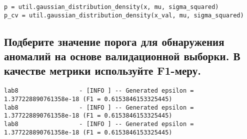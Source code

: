 \begin{lstlisting}
p = util.gaussian_distribution_density(x, mu, sigma_squared)
p_cv = util.gaussian_distribution_density(x_val, mu, sigma_squared)
\end{lstlisting}

\subsection{Подберите значение порога для обнаружения аномалий на основе валидационной выборки. В качестве метрики используйте F1-меру.}

\begin{lstlisting}
lab8                 - [INFO ] -- Generated epsilon = 1.377228890761358e-18 (F1 = 0.6153846153325445)
lab8                 - [INFO ] -- Generated epsilon = 1.377228890761358e-18 (F1 = 0.6153846153325445)
lab8                 - [INFO ] -- Generated epsilon = 1.377228890761358e-18 (F1 = 0.6153846153325445)
\end{lstlisting}


